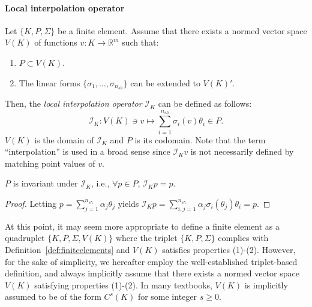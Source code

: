 \paragraph{Local interpolation operator}
Let $\{K, P, \Sigma\}$ be a finite element. Assume that there exists a normed vector space $V(K)$ of functions $v: K \rightarrow \mathbb{R}^m$ such that:
\begin{enumerate}
    \item $P \subset V(K)$.
    \item The linear forms $\{\sigma_1, \dots, \sigma_{n_{sh}}\}$ can be extended to $V(K)'$.
\end{enumerate}
Then, the \emph{local interpolation operator} $\mathcal{I}_K$ can be defined as follows:
\begin{equation}
    \mathcal{I}_K: V(K) \ni v \mapsto \sum_{i=1}^{n_{sh}} \sigma_i(v) \theta_i \in P.
\end{equation}
$V(K)$ is the domain of $\mathcal{I}_K$ and $P$ is its codomain. Note that the term ``interpolation'' is used in a broad sense since $\mathcal{I}_K v$ is not necessarily defined by matching point values of $v$.
\begin{lemma}\label{lemma:P_invariant_under_IK}
    $P$ is invariant under $\mathcal{I}_K$, i.e., $\forall p \in P$, $\mathcal{I}_K p = p$.
    \begin{proof}
        Letting $p = \sum_{j=1}^{n_{sh}} \alpha_j \theta_j$ yields $\mathcal{I}_K p = \sum_{i,j=1}^{n_{sh}} \alpha_j \sigma_i(\theta_j) \theta_i = p$.
    \end{proof}
\end{lemma}


At this point, it may seem more appropriate to define a finite element as a quadruplet $\{K, P, \Sigma, V(K)\}$ where the triplet $\{K, P, \Sigma\}$ complies with Definition~\ref{def:finiteelements} and $V(K)$ satisfies properties (1)-(2). However, for the sake of simplicity, we hereafter employ the well-established triplet-based definition, and always implicitly assume that there exists a normed vector space $V(K)$ satisfying properties (1)-(2). In many textbooks, $V(K)$ is implicitly assumed to be of the form $C^s(K)$ for some integer $s \ge 0$.

